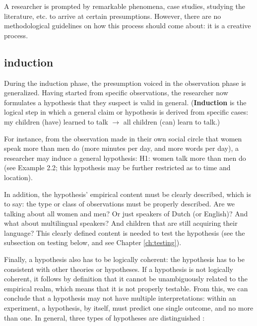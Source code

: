 \documentclass[
]{book}
\begin{document}
A researcher is prompted by remarkable phenomena, case studies, studying the literature, etc. to arrive at certain presumptions. However, there are no methodological guidelines on how this process should come about: it is a creative process.

\hypertarget{induction}{%
\subsection{induction}\label{induction}}

During the induction phase, the presumption voiced in the observation phase is generalized. Having started from specific observations, the researcher now formulates a hypothesis that they suspect is valid in general. (\textbf{Induction} is the logical step in which a general claim or hypothesis is derived from specific cases: my children (have) learned to talk \(\rightarrow\) all children (can) learn to talk.)

For instance, from the observation made in their own social circle that women speak more than men do (more minutes per day, and more words per day), a researcher may induce a general hypothesis: H1: women talk more than men do (see Example 2.2; this hypothesis may be further restricted as to time and location).

In addition, the hypothesis' empirical content must be clearly described, which is to say: the type or class of observations must be properly described. Are we talking about all women and men? Or just speakers of Dutch (or English)? And what about multilingual speakers? And children that are still acquiring their language? This clearly defined content is needed to test the hypothesis (see the subsection on testing below, and see Chapter \ref{ch:testing}).

Finally, a hypothesis also has to be logically coherent: the hypothesis has to be consistent with other theories or hypotheses. If a hypothesis is not logically coherent, it follows by definition that it cannot be unambiguously related to the empirical realm, which means that it is not properly testable. From this, we can conclude that a hypothesis may not have multiple interpretations: within an experiment, a hypothesis, by itself, must predict one single outcome, and no more than one.
In general, three types of hypotheses are distinguished \citep{Groot61}:
\end{document}
